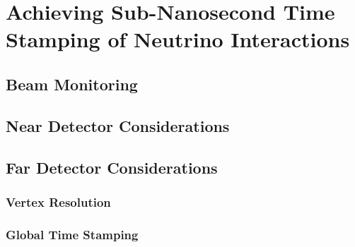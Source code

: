 
%
\section{Achieving Sub-Nanosecond Time Stamping of Neutrino Interactions}
\label{Detection Feasibility}

\subsection{Beam Monitoring}

\subsection{Near Detector Considerations}

\subsection{Far Detector Considerations}

\subsubsection{Vertex Resolution}

\subsubsection{Global Time Stamping}


